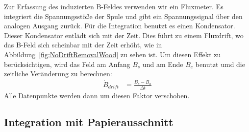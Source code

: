 \documentclass[a4paper,10pt,twocolumn]{article}
\begin{document}
    Zur Erfassung des induzierten B-Feldes verwenden wir ein Fluxmeter.
    Es integriert die Spannungsstöße der Spule und gibt ein Spannungssignal über den analogen Ausgang zurück.
    Für die Integration benutzt es einen Kondensator.
    Dieser Kondensator entlädt sich mit der Zeit.
    Dies führt zu einem Fluxdrift, wo das B-Feld sich scheinbar mit der Zeit erhöht, wie 
    in Abbildung~\ref{fig:NoDriftRemovalWood} zu sehen ist.
    Um diesen Effekt zu berücksichtigen, wird das Feld am Anfang $B_s$ und am Ende $B_e$ benutzt umd die
    zeitliche Veränderung zu berechnen:
    \begin{align*}
        \dot{B}_{drift} &= \frac{B_e - B_a}{\Delta t}
    \end{align*}
    Alle Datenpunkte werden dann um diesen Faktor verschoben.
    
    \subsection{Integration mit Papierausschnitt}
    \label{subsec:ManualIntegration}
    
\end{document}
